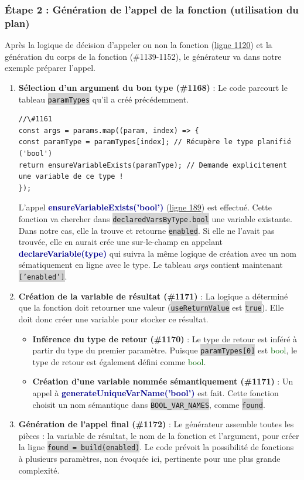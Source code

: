 \documentclass[11pt,a4paper]{article}
\newcommand{\code}[1]{\colorbox{lightgray}{\texttt{\small #1}}}
\newcommand{\var}[1]{\textit{#1}}
\newcommand{\vartype}[1]{\textcolor{darkgreen}{#1}}
\newcommand{\methodname}[1]{\textbf{\textcolor{darkblue}{#1}}}
\begin{document}
\subsubsection*{Étape 2 : Génération de l'appel de la fonction (utilisation du plan)}
Après la logique de décision d'appeler ou non la fonction (\href{https://github.com/edu-mateescoj/gyminf/blob/main/static/js/code-generator.js#L1120}{ligne 1120}) et la génération du corps de la fonction (\#1139-1152), le générateur va dans notre exemple préparer l'appel.
\begin{enumerate}
\item \textbf{Sélection d'un argument du bon type (\#1168)} : Le code parcourt le tableau \code{paramTypes} qu'il a créé précédemment.
\begin{verbatim}
//\#1161
const args = params.map((param, index) => {
const paramType = paramTypes[index]; // Récupère le type planifié ('bool')
return ensureVariableExists(paramType); // Demande explicitement une variable de ce type !
});
\end{verbatim}
L'appel \methodname{ensureVariableExists('bool')} (\href{https://github.com/edu-mateescoj/gyminf/blob/main/static/js/code-generator.js#L189}{ligne 189}) est effectué. Cette fonction va chercher dans \code{declaredVarsByType.bool} une variable existante. Dans notre cas, elle la trouve et retourne \code{enabled}. Si elle ne l'avait pas trouvée, elle en aurait crée une
sur-le-champ en appelant \methodname{declareVariable(type)} qui suivra la même logique de création avec un nom sématiquement en ligne avec le type. Le tableau \var{args} contient maintenant \code{['enabled']}.

\item \textbf{Création de la variable de résultat (\#1171)} : La logique a déterminé que la fonction doit retourner une valeur (\code{useReturnValue} est \code{true}). Elle doit donc créer une variable pour stocker ce résultat.
\begin{itemize}
    \item \textbf{Inférence du type de retour (\#1170)} : Le type de retour est inféré à partir du type du premier paramètre. Puisque \code{paramTypes[0]} est \vartype{bool}, le type de retour est également défini comme \vartype{bool}.
    \item \textbf{Création d'une variable nommée sémantiquement (\#1171)} : Un appel à \methodname{generateUniqueVarName('bool')} est fait. Cette fonction choisit un nom sémantique dans \code{BOOL\_VAR\_NAMES}, comme \code{found}.
\end{itemize}

\item \textbf{Génération de l'appel final (\#1172)} : Le générateur assemble toutes les pièces : la variable de résultat, le nom de la fonction et l'argument, pour créer la ligne \code{found = build(enabled)}. Le code prévoit la possibilité de fonctions à plusieurs paramètres, non évoquée ici, pertinente pour une plus grande complexité.
\end{enumerate}
\end{document}
